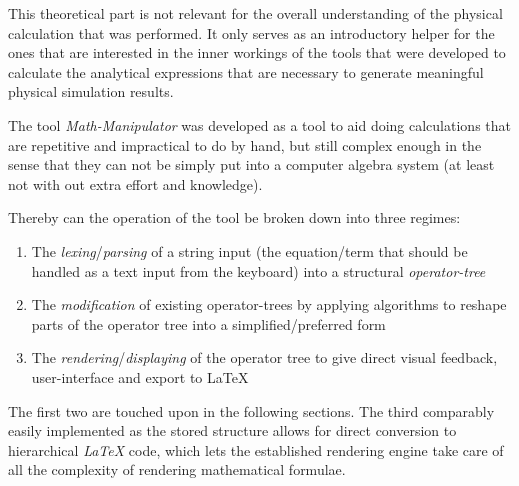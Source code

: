 This theoretical part is not relevant for the overall understanding of the physical calculation that was performed.
It only serves as an introductory helper for the ones that are interested in the inner workings of the tools that were developed to calculate the analytical expressions that are necessary to generate meaningful physical simulation results.

The tool \emph{Math-Manipulator} was developed as a tool to aid doing calculations that are repetitive and impractical to do by hand, but still complex enough in the sense that they can not be simply put into a computer algebra system (at least not with out extra effort and knowledge).

Thereby can the operation of the tool be broken down into three regimes: 
\begin{enumerate}
    \item The \emph{lexing}/\emph{parsing} of a string input (the equation/term that should be handled as a text input from the keyboard) into a structural \emph{operator-tree} 
    \item The \emph{modification} of existing operator-trees by applying algorithms to reshape parts of the operator tree into a simplified/preferred form
    \item The \emph{rendering}/\emph{displaying} of the operator tree to give direct visual feedback, user-interface and export to \LaTeX
\end{enumerate}

The first two are touched upon in the following sections. 
The third comparably easily implemented as the stored structure allows for direct conversion to hierarchical \emph{LaTeX} code, which lets the established rendering engine take care of all the complexity of rendering mathematical formulae.